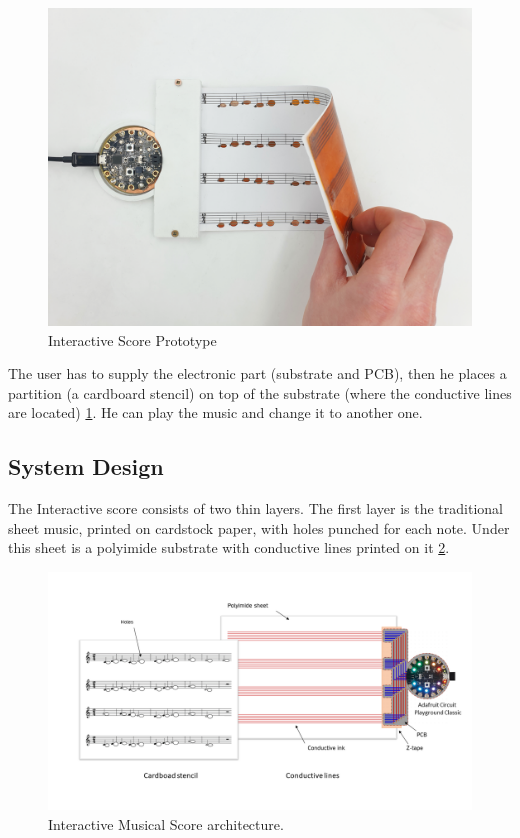 \begin{figure}[h]
    \centering
    \includegraphics{images/IS_demo.png}
    \caption{Interactive Score Prototype}
    \label{fig:IS_demo}
\end{figure}

The user has to supply the electronic part (substrate and PCB), then he places a partition (a cardboard stencil) on top of the substrate (where
the conductive lines are located) \ref{fig:IS_demo}. He can play the music and change it to another one.

\subsection{System Design}

The Interactive score consists of two thin layers. The first layer is the traditional sheet
music, printed on cardstock paper, with holes punched for each note. Under this sheet
is a polyimide substrate with conductive lines printed on it \ref{fig:IS_schema}. 

\begin{figure}[h]
    \centering
    \includegraphics{images/IS_schema.png}
    \caption{Interactive Musical Score architecture.}
    \label{fig:IS_schema}
\end{figure}

